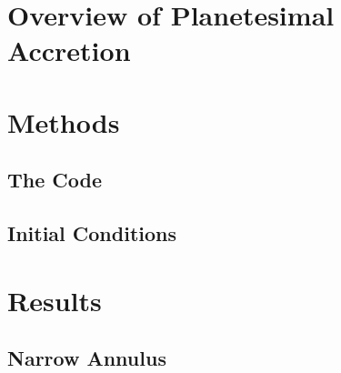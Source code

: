 \documentclass[onecolumn]{aastex63}
\begin{document}
\section{Overview of Planetesimal Accretion}\label{sec:theory}





\section{Methods}\label{sec:methods}

\subsection{The Code}

\subsection{Initial Conditions}

\section{Results}\label{sec:results}

\subsection{Narrow Annulus}
\end{document}
